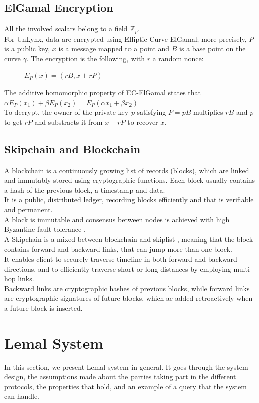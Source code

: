 \documentclass{article}
\begin{document}
\subsection{ElGamal Encryption}
All the involved scalars belong to a field $\mathbb{Z}_p$.\\
For UnLynx, data are encrypted using Elliptic Curve ElGamal; more precisely, $P$ is a public key, $x$ is a message mapped to a point and $B$ is a base point on the curve $\gamma$. The encryption is the following, with $r$ a random nonce:\\
\begin{figure}[H]
\center
$E_P(x) = (rB,x+rP)$
\end{figure}
The additive homomorphic property of EC-ElGamal states that $\alpha E_P(x_1) + \beta E_P(x_2) = E_P(\alpha x_1+ \beta x_2)$\\
To decrypt, the owner of the private key $p$ satisfying $P = pB$ multiplies $rB$ and $p$ to get $rP$ and substracts it from $x + rP$ to recover $x$.\\

\subsection{Skipchain and Blockchain}
A blockchain is a continuously growing list of records (blocks), which are linked and immutably stored using cryptographic functions. Each block usually contains a hash of the previous block, a timestamp and data.\\
It is a public, distributed ledger, recording blocks efficiently and that is verifiable and permanent.\\
A block is immutable and consensus between nodes is achieved with high Byzantine fault tolerance \cite{bft}.\\
A Skipchain is a mixed between blockchain and skiplist \cite{skiplist}, meaning that the block contains forward and backward links, that can jump more than one block.\\
It enables client to securely traverse timeline in both forward and backward directions, and to efficiently traverse short or long distances by employing multi-hop links.\\
Backward links are cryptographic hashes of previous blocks, while forward links are cryptographic signatures of future blocks, which ae added retroactively when a future block is inserted.



\section{Lemal System}
In this section, we present Lemal \cite{lemal} system in general. It goes through the system design, the assumptions made about the parties taking part in the different protocols, the properties that hold, and an example of a query that the system can handle.\\
\end{document}
